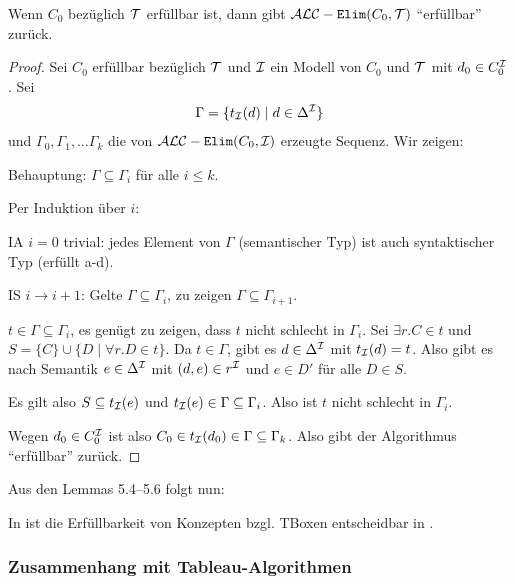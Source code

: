 \begin{lemma}
    Wenn $C_0$ bezüglich $\mathcal{T}$ erfüllbar ist, dann gibt $\mathcal{A}\mathcal{L}\mathcal{C}-\texttt{Elim}(C_0, \mathcal{T})$ \enquote{erfüllbar} zurück.
\end{lemma}

\begin{proof}
    Sei $C_0$ erfüllbar bezüglich $\mathcal{T}$ und $\mathcal{I}$ ein Modell von $C_0$ und $\mathcal{T}$ mit $d_0 \in C_0^{\mathcal{I}}$. Sei
    \begin{align*}
        \Gamma = \{ t_{\mathcal{I}}(d) \mid d \in \Delta^{\mathcal{I}}\}
    \end{align*}
    und $\Gamma_0, \Gamma_1, \ldots \Gamma_k$ die von $\mathcal{A}\mathcal{L}\mathcal{C}-\texttt{Elim}(C_0, \mathcal{I})$ erzeugte Sequenz.
    Wir zeigen:

    Behauptung: $\Gamma \subseteq \Gamma_i$ für alle $i \leq k$.
    \begin{tafel}
    Per Induktion über $i$:

    IA $i = 0$ trivial: jedes Element von $\Gamma$ (semantischer Typ) ist auch syntaktischer Typ (erfüllt a-d).

    IS $i \rightarrow i + 1$: Gelte $\Gamma \subseteq \Gamma_i$, zu zeigen $\Gamma \subseteq \Gamma_{i + 1}$.

    $t \in \Gamma \subseteq \Gamma_i$, es genügt zu zeigen, dass $t$ nicht schlecht in $\Gamma_i$. Sei $\exists r.C \in t$ und $S = \{C\} \cup \{D\mid \forall r.D \in t\}$. Da $t \in \Gamma$, gibt es $d \in \Delta^{\mathcal{I}}$ mit $t_{\mathcal{I}}(d) = t$. Also gibt es nach Semantik $e \in \Delta^{\mathcal{I}}$ mit $(d, e) \in r^{\mathcal{I}}$ und $e \in D'$ für alle $D \in S$.

    Es gilt also $S \subseteq t_{\mathcal{I}}(e)$ und $t_{\mathcal{I}}(e) \in \Gamma \subseteq \Gamma_i$. Also ist $t$ nicht schlecht in $\Gamma_i$.
    \end{tafel}
    Wegen $d_0 \in C_0^{\mathcal{I}}$ ist also $C_0 \in t_{\mathcal{I}}(d_0) \in \Gamma \subseteq \Gamma_k$. Also gibt der Algorithmus \enquote{erfüllbar} zurück.
\end{proof}


Aus den Lemmas 5.4--5.6 folgt nun:

\begin{theorem}\label{thm:tbox-exptime}
In \ALC ist die Erfüllbarkeit von Konzepten bzgl. TBoxen entscheidbar in \ExpTime.
\end{theorem}

\subsubsection{Zusammenhang mit Tableau-Algorithmen}

